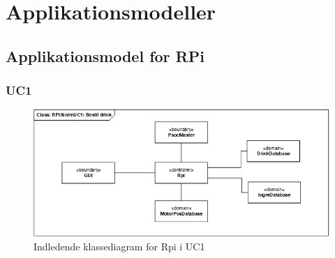 \section{Applikationsmodeller}

\subsection{Applikationsmodel for RPi}
\subsubsection{UC1}

\begin{figure}[H]
    \centering
    \includegraphics[width=1\textwidth]{Images/Applikationsmodeller/rpi/rpi_klassediagramNormUC1.png}
    \caption{Indledende klassediagram for Rpi i UC1}
    \label{fig:cdUC1Rpi}
\end{figure}

